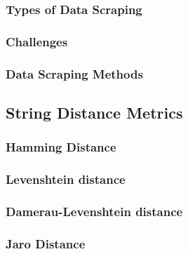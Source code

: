 \subsubsection{Types of Data Scraping}
\subsubsection{Challenges}
\subsubsection{Data Scraping Methods}

\subsection{String Distance Metrics}
\subsubsection{Hamming Distance}
\subsubsection{Levenshtein distance}
\subsubsection{Damerau-Levenshtein distance}
\subsubsection{Jaro Distance}